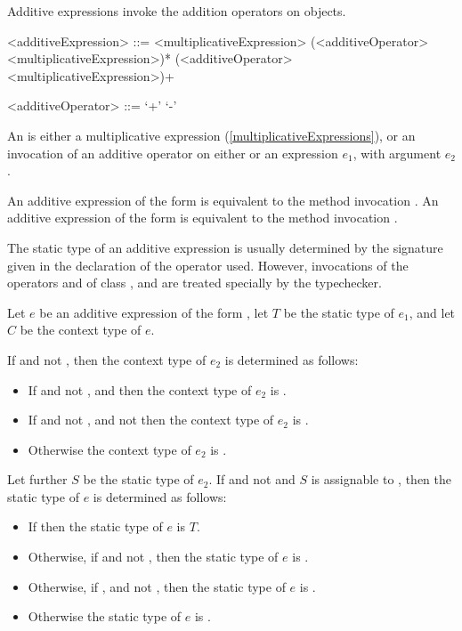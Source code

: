 \documentclass[makeidx]{article}
\begin{document}
\LMHash{}%
Additive expressions invoke the addition operators on objects.

\begin{grammar}
<additiveExpression> ::= <multiplicativeExpression>
  \gnewline{} (<additiveOperator> <multiplicativeExpression>)*
  \alt \SUPER{} (<additiveOperator> <multiplicativeExpression>)+

<additiveOperator> ::= `+'
  \alt `-'
\end{grammar}

\LMHash{}%
An  is either a multiplicative expression
(\ref{multiplicativeExpressions}),
or an invocation of an additive operator
on either \SUPER{} or an expression $e_1$,
with argument $e_2$.

\LMHash{}%
An additive expression of the form 
is equivalent to the method invocation .
An additive expression of the form 
is equivalent to the method invocation .

\LMHash{}%
The static type of an additive expression is usually determined
by the signature given in the declaration of the operator used.
However, invocations of the operators \code{+} and \code{-} of
class ,  and 
are treated specially by the typechecker.

\LMHash{}%
Let $e$ be an additive expression of the form ,
let $T$ be the static type of $e_1$,
and let $C$ be the context type of $e$.

If  and not , then
the context type of $e_2$ is determined as follows:
\begin{itemize}
  \item{} If  and not ,
      and 
      then the context type of $e_2$ is .
  \item{} If  and not ,
      and not 
     then the context type of $e_2$ is .
  \item{} Otherwise the context type of $e_2$ is .
\end{itemize}
Let further $S$ be the static type of $e_2$.
If  and not 
and $S$ is assignable to ,
then the static type of $e$ is determined as follows:
\begin{itemize}
  \item{} If 
    then the static type of $e$ is $T$.
  \item{} Otherwise, if 
    and not ,
    then the static type of $e$ is .
  \item{} Otherwise, if ,
     and not ,
    then the static type of $e$ is .
  \item{} Otherwise the static type of $e$ is .
\end{itemize}
\end{document}
